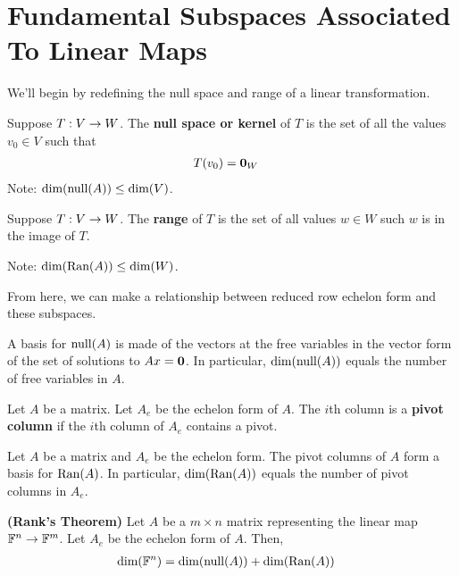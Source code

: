 \section{Fundamental Subspaces Associated To Linear Maps}
We'll begin by redefining the null space and range of a linear transformation.

\begin{definition}
    Suppose $T : V \rightarrow W$. The \textbf{null space or kernel} of $T$ is the set of all the values $v_0 \in V$ such that
    \begin{align*}
        T(v_0) &= \mathbf{0}_W
    \end{align*}
    Note: $\text{dim}(\text{null}(A)) \leq \text{dim}(V)$.
\end{definition}
\begin{definition}
    Suppose $T : V \rightarrow W$. The \textbf{range} of $T$ is the set of all values $w \in W$ such $w$ is in the image of $T$.

    Note: $\text{dim}(\text{Ran}(A)) \leq \text{dim}(W)$.
\end{definition}

From here, we can make a relationship between reduced row echelon form and these subspaces.
\begin{thm}
    A basis for $\text{null}(A)$ is made of the vectors at the free variables in the vector form of the set of solutions to $Ax = \mathbf{0}$. In particular,
    $\text{dim}(\text{null}(A))$ equals the number of free variables in $A$.
\end{thm}

\begin{definition}
    Let $A$ be a matrix. Let $A_e$ be the echelon form of $A$. The $i$th column is a \textbf{pivot column} if the $i$th column of $A_e$ contains a 
    pivot.
\end{definition}
\begin{thm}
    Let $A$ be a matrix and $A_e$ be the echelon form. The pivot columns of $A$ form a basis for $\text{Ran}(A)$. In particular, $\text{dim}(\text{Ran}(A))$ equals
    the number of pivot columns in $A_e$.
\end{thm}

\begin{thm} \textbf{(Rank's Theorem)}
    Let $A$ be a $m \times n$ matrix representing the linear map $\mathbb{F}^n \rightarrow \mathbb{F}^m$. Let $A_e$ be the echelon form of $A$. Then,
    \begin{align*}
        \text{dim}(\mathbb{F}^n) &= \text{dim}(\text{null}(A)) + \text{dim}(\text{Ran}(A))
    \end{align*}
\end{thm}